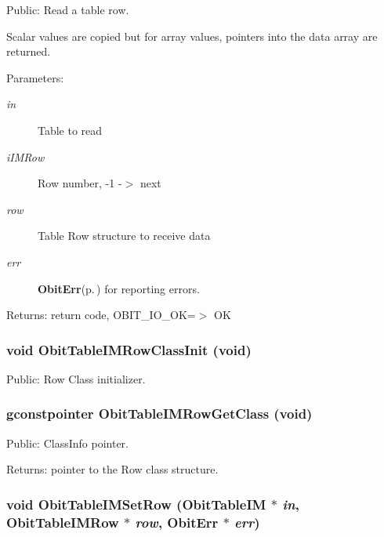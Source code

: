 Public: Read a table row. 

Scalar values are copied but for array values, pointers into the data array are returned. \begin{Desc}
\item[Parameters:]
\begin{description}
\item[{\em in}]Table to read \item[{\em i\-IMRow}]Row number, -1 -$>$ next \item[{\em row}]Table Row structure to receive data \item[{\em err}]{\bf Obit\-Err}{\rm (p.\,\pageref{structObitErr})} for reporting errors. \end{description}
\end{Desc}
\begin{Desc}
\item[Returns:]return code, OBIT\_\-IO\_\-OK=$>$ OK \end{Desc}
\subsubsection{\setlength{\rightskip}{0pt plus 5cm}void Obit\-Table\-IMRow\-Class\-Init (void)}\label{ObitTableIM_8h_a7}


Public: Row Class initializer. 

\subsubsection{\setlength{\rightskip}{0pt plus 5cm}gconstpointer Obit\-Table\-IMRow\-Get\-Class (void)}\label{ObitTableIM_8h_a9}


Public: Class\-Info pointer. 

\begin{Desc}
\item[Returns:]pointer to the Row class structure. \end{Desc}
\subsubsection{\setlength{\rightskip}{0pt plus 5cm}void Obit\-Table\-IMSet\-Row ({\bf Obit\-Table\-IM} $\ast$ {\em in}, {\bf Obit\-Table\-IMRow} $\ast$ {\em row}, {\bf Obit\-Err} $\ast$ {\em err})}\label{ObitTableIM_8h_a19}


